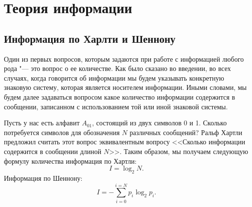 \documentclass[b5paper,11pt]{book}
\begin{document}
	
	\chapter{Теория информации}
	
	\section{Информация по Харлти и Шеннону}
	Один из первых вопросов, которым задаются при работе с информацией любого рода "--- это вопрос о ее количестве. Как было сказано во введении, во всех случаях, когда говорится об информации мы будем указывать конкретную знаковую систему, которая является носителем информации. Иными словами, мы будем далее задаваться вопросом какое количество информации содержится в сообщении, записанном с использованием той или иной знаковой системы.
	
	Пусть у нас есть алфавит $A_{01}$, состоящий из двух символов 0 и 1. Сколько потребуется символов для обозначения $N$ различных сообщений? Ральф Хартли предложил считать этот вопрос эквивалентным вопросу <<Сколько информации содержится в сообщении длиной $N$>>. Таким образом, мы получаем следующую формулу количества информация по Хартли:
	\begin{equation}
		I = \log_2N.
	\end{equation}
	Информация по Шеннону:
	\begin{equation}
		I = -\sum_{i=0}^{i=N} p_i\log_2p_i.
	\end{equation}
\end{document}
